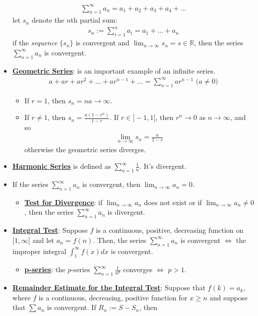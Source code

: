 \documentclass[reqno,11pt]{amsart}
\theoremstyle{definition}
\theoremstyle{remark}
\newcommand{\R}{\mathbb{R}}
\newcommand{\dfn}[1]{\underline{\textbf{#1}}}
\begin{document}
\begin{itemize}[noitemsep]
	\begin{align*}
		\sum_{n=1}^\infty a_n = a_1 + a_2 + a_3 + a_4 + ... 
	\end{align*}
	let $s_n$ denote the $n$th partial sum: 
	\begin{align*}
		s_n := \sum_{i=1}^n a_i = a_1 + ... + a_n 
	\end{align*}
	if the \emph{sequence} $\{ s_n \}$ is convergent and $\lim_{n \rightarrow \infty} s_n = s \in \R$, then the series $\sum_{n=1}^\infty a_n$ is convergent. 
	\item \dfn{Geometric Series}: is an important example of an infinite series.
	\begin{align}
		a + ar + ar^2 + ... + ar^{n-1} + ... = \sum_{n=1}^\infty ar^{n-1} \text{ ($a \neq 0$)} 	
	\end{align}
	\begin{itemize}[noitemsep]
		\item If $r=1$, then $s_n = na \rightarrow \infty$. 
		\item If $r \neq 1$, then $s_n = \frac{a(1-r^n)}{1-r}$. If $ r \in ]-1, 1[$, then $r^n \rightarrow 0 $ as $n \rightarrow \infty$, and so 
		\begin{align}
			\lim_{n \rightarrow \infty} s_n = \frac{a}{1-r}	
		\end{align}
		otherwise the geometric series diverges. 
	\end{itemize}
	\item \dfn{Harmonic Series} is defined as $\sum_{n=1}^\infty \frac{1}{n}$. It's divergent. 
	\item If the series $\sum_{n=1}^\infty a_n$ is convergent, then $\lim_{n \rightarrow \infty} a_n =0$. 
	\begin{itemize}
		\item \dfn{Test for Divergence}: if $\lim_{n \rightarrow \infty} a_n$ does not exist or if $\lim_{n \rightarrow \infty} a_n \neq 0$, then the series $\sum_{n=1}^\infty a_n$ is divergent.
	\end{itemize}
	\item \dfn{Integral Test}: Suppose $f$ is a continuous, positive, decreasing function on $[1, \infty[$ and let $a_n = f(n)$. Then, the series $\sum_{n=1}^\infty a_n$ is convergent $\iff$ the improper integral $\int_1^\infty f(x) dx $ is convergent. 
	\begin{itemize}
		\item \dfn{p-series}: the $p$-series $\sum_{n=1}^\infty \frac{1}{n^p}$ converges $\iff$ $p >1$. 
	\end{itemize}
	\item \dfn{Remainder Estimate for the Integral Test}: Suppose that $f(k) = a_k$, where $f$ is a continuous, decreasing, positive function for $x \geq n$ and suppose that $\sum a_n$ is convergent. If $R_n := S - S_n$, then

\end{itemize}
\end{document}
